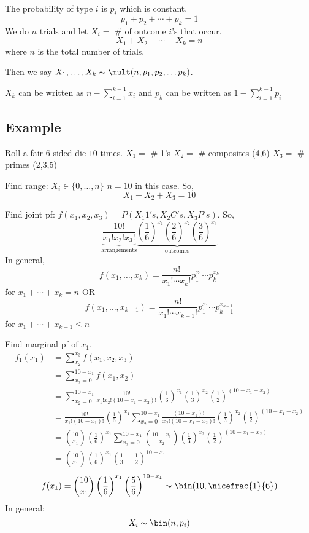 The probability of type $ i $ is $ p_i $ which is constant.
\[ p_1+p_2+\cdots+p_k=1 \]
We do $ n $ trials and let $ X_i= $ \# of outcome $ i $'s that occur.
\[ X_1+X_2+\cdots+X_k=n \]
where $ n $ is the total number of trials.

Then we say $ X_1,\ldots ,X_k \thicksim \mult(n,p_1,p_2,\ldots p_k) $.
\begin{remark}
    $ X_k $ can be written as $ n-\sum\limits_{i=1}^{k-1}x_i $ and
    $ p_k $ can be written as $ 1-\sum\limits_{i=1}^{k-1} p_i $
\end{remark}

\subsection{Example}
Roll a fair $6$-sided die $ 10 $ times.
$ X_1= $ \# 1's
$ X_2= $ \# composites (4,6)
$ X_3= $ \# primes (2,3,5)

Find range: $ X_i\in \{0,\ldots ,n\} $ $ n=10 $ in this case. So,
\[ X_1+X_2+X_3=10 \]

Find joint pf: $ f({x_1},{x_2},{x_3})=P(X_1 1's, X_2 C's, X_3 P's) $. So,
\[ \underbrace{\frac{10!}{{x_1}!{x_2}!{x_3}!}}_{\text{arrangements}}
\underbrace{\left( \frac{1}{6}  \right)^{x_1} 
\left( \frac{2}{6} \right)^{x_2} \left( \frac{3}{6} \right)^{x_3}}_{\text{outcomes}}\]
In general,
\[ f({x_1},\ldots,x_k)=\frac{n!}{{x_1}!\cdots x_k!}p_1^{{x_1}} \cdots p_k^{x_k}\]
for $ {x_1}+\cdots+x_k=n $
OR
\[ f({x_1},\ldots,x_{k-1})=\frac{n!}{{x_1}!\cdots x_{k-1}!}p_1^{{x_1}} \cdots
p_{k-1}^{x_{k-1}}\]
for $ {x_1}+\cdots+x_{k-1}\le n $

Find marginal pf of $ {x_1} $.
\begin{align*}
    f_1({x_1})&=\sum\limits_{{x_2}}^{{x_3}} f({x_1},{x_2},{x_3})\\
    &=\sum\limits_{{x_2}=0}^{10-{x_1}} f({x_1},{x_2})\\
    &=\sum\limits_{{x_2}=0}^{10-{x_1}} \frac{10!}{{x_1}!{x_2}!(10-{x_1}-{x_2})!}
    \left( \frac{1}{6} \right)^{x_1} 
    \left( \frac{1}{3} \right)^{x_2} \left( \frac{1}{2} \right)^{(10-{x_1}-{x_2})}\\
    &=\frac{10!}{{x_1}!(10-{x_1})!}\left( \frac{1}{6}  \right)^{x_1}
    \sum\limits_{{x_2}=0}^{10-{x_1}} \frac{(10-{x_1})!}{{x_2}!(10-{x_1}-{x_2})!}
    \left( \frac{1}{3} \right)^{x_2} \left( \frac{1}{2} \right)^{(10-{x_1}-{x_2})}\\
    &=\binom{10}{{x_1}}\left( \frac{1}{6}  \right)^{x_1}
    \sum\limits_{{x_2}=0}^{10-{x_1}} \binom{10-{x_1}}{{x_2}}
    \left( \frac{1}{3} \right)^{x_2} \left( \frac{1}{2} \right)^{(10-{x_1}-{x_2})}\\
    &=\binom{10}{{x_1}}\left( \frac{1}{6}  \right)^{x_1}
    \left(\frac{1}{3}+\frac{1}{2} \right)^{10-x_1}
\end{align*}
\[ f(x_1)=\binom{10}{{x_1}}\left( \frac{1}{6}  \right)^{x_1}
\left(\frac{5}{6} \right)^{10-x_1} \thicksim \bin(10,\nicefrac{1}{6} )\]
In general:
\[ X_i \thicksim \bin(n,p_i) \]



